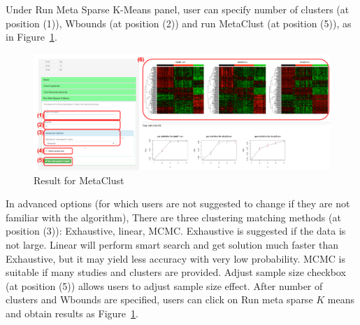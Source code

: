 \begin{steps}
Under Run Meta Sparse K-Means panel,
user can specify number of clusters (at position {\color{red} (1)}), Wbounds (at position {\color{red} (2)}) and run MetaClust (at position {\color{red} (5)}), 
as in Figure~\ref{fig:mskmRes}.
\begin{figure}[H]
\begin{center}
\includegraphics[scale=0.5]{./figure/metaClust/mskmRes.pdf}
\caption{Result for MetaClust}
\label{fig:mskmRes}
\end{center}
\end{figure}
In advanced options (for which users are not suggested to change if they are not familiar with the algorithm), 
There are three clustering matching methods (at position {\color{red} (3)}): Exhaustive, linear, MCMC.
Exhaustive is suggested if the data is not large.
Linear will perform smart search and get solution much faster than Exhaustive, 
but it may yield less accuracy with very low probability.
MCMC is suitable if many studies and clusters are provided.
Adjust sample size checkbox (at position {\color{red} (5)}) allows users to adjust sample size effect.
After number of clusters and Wbounds are specified,
users can click on Run meta sparse $K$ means and obtain results as Figure~\ref{fig:mskmRes}.

\end{steps}

